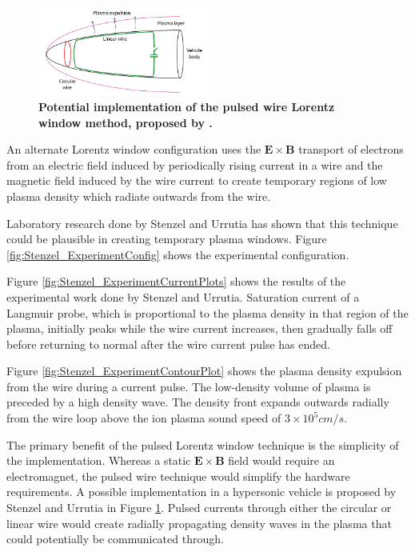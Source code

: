 \documentclass[twocolumn]{article}
\begin{document}
			\begin{figure}[!ht]
				\centering
				\includegraphics[width=0.5\textwidth]{Images/Stenzel_Implementation}
				\caption{\textbf{Potential implementation of the pulsed wire Lorentz window method, proposed by \cite{stenzel_new_2013}.}}
				\label{fig:Stenzel_Implementation}
			\end{figure}
			
			
			An alternate Lorentz window configuration uses the $\mathbf{E \times B}$ transport of electrons from an electric field induced by periodically rising current in a wire and the magnetic field induced by the wire current to create temporary regions of low plasma density which radiate outwards from the wire.\cite{stenzel_new_2013}
			
			Laboratory research done by Stenzel and Urrutia \cite{stenzel_new_2013} has shown that this technique could be plausible in creating temporary plasma windows.
			Figure \ref{fig:Stenzel_ExperimentConfig} shows the experimental configuration.
			
			Figure \ref{fig:Stenzel_ExperimentCurrentPlots} shows the results of the experimental work done by Stenzel and Urrutia.
			Saturation current of a Langmuir probe, which is proportional to the plasma density in that region of the plasma, initially peaks while the wire current increases, then gradually falls off before returning to normal after the wire current pulse has ended.
			
			Figure \ref{fig:Stenzel_ExperimentContourPlot} shows the plasma density expulsion from the wire during a current pulse.
			The low-density volume of plasma is preceded by a high density wave.
			The density front expands outwards radially from the wire loop above the ion plasma sound speed of $3\times10^5 cm/s$.\cite{stenzel_new_2013}
			
			The primary benefit of the pulsed Lorentz window technique is the simplicity of the implementation.
			Whereas a static $\mathbf{E\times B}$ field would require an electromagnet, the pulsed wire technique would simplify the hardware requirements.
			A possible implementation in a hypersonic vehicle is proposed by Stenzel and Urrutia in Figure \ref{fig:Stenzel_Implementation}.
			Pulsed currents through either the circular or linear wire would create radially propagating density waves in the plasma that could potentially be communicated through.
\end{document}
